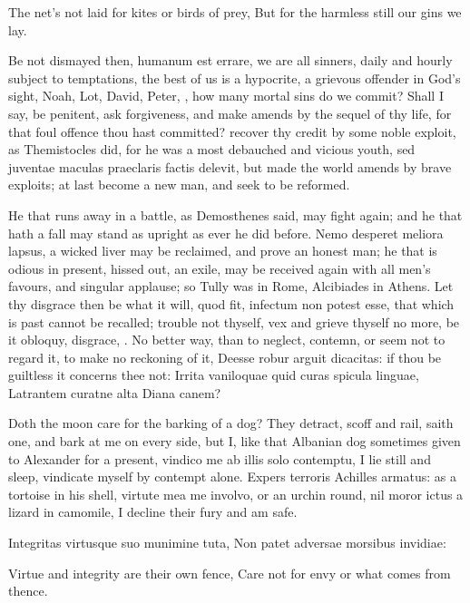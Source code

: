 {The net's not laid for kites or birds of prey,
But for the harmless still our gins we lay.

Be not dismayed then, humanum est errare, we are all sinners, daily and
hourly subject to temptations, the best of us is a hypocrite, a
grievous offender in God's sight, Noah, Lot, David, Peter, \etc{}, how
many mortal sins do we commit? Shall I say, be penitent, ask
forgiveness, and make amends by the sequel of thy life, for that foul
offence thou hast committed? recover thy credit by some noble exploit,
as Themistocles did, for he was a most debauched and vicious youth, sed
juventae maculas praeclaris factis delevit, but made the world amends
by brave exploits; at last become a new man, and seek to be reformed.

He that runs away in a battle, as Demosthenes said, may fight again;
and he that hath a fall may stand as upright as ever he did before.
Nemo desperet meliora lapsus, a wicked liver may be reclaimed, and
prove an honest man; he that is odious in present, hissed out, an
exile, may be received again with all men's favours, and singular
applause; so Tully was in Rome, Alcibiades in Athens. Let thy disgrace
then be what it will, quod fit, infectum non potest esse, that which is
past cannot be recalled; trouble not thyself, vex and grieve thyself no
more, be it obloquy, disgrace, \etc{}. No better way, than to neglect,
contemn, or seem not to regard it, to make no reckoning of it, Deesse
robur arguit dicacitas: if thou be guiltless it concerns thee not:
Irrita vaniloquae quid curas spicula linguae,
Latrantem curatne alta Diana canem?

Doth the moon care for the barking of a dog? They detract, scoff and
rail, saith one, and bark at me on every side, but I, like that
Albanian dog sometimes given to Alexander for a present, vindico me ab
illis solo contemptu, I lie still and sleep, vindicate myself by
contempt alone. Expers terroris Achilles armatus: as a tortoise
in his shell, virtute mea me involvo, or an urchin round, nil
moror ictus a lizard in camomile, I decline their fury and am
safe.

Integritas virtusque suo munimine tuta,
Non patet adversae morsibus invidiae:

Virtue and integrity are their own fence,
Care not for envy or what comes from thence.

}
